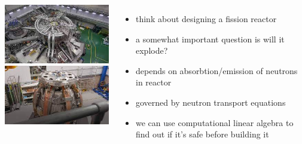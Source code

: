\documentclass[handout]{beamer}
\begin{document}
\begin{frame}{}
 \begin{columns}
    \centering
             \includegraphics[width=\linewidth]{img/fusion1.jpg}
	     \\\vspace{.3in}
             \includegraphics[width=\linewidth]{img/fusion2.jpg}
    \begin{itemize}
      \item think about designing a fission reactor
      \item a somewhat important question is will it explode?
      \item depends on absorbtion/emission of neutrons in reactor
      \item governed by neutron transport equations
      \item we can use computational linear algebra to find out if it's safe before building it
    \end{itemize}
 \end{columns} 
\end{frame}
\end{document}

